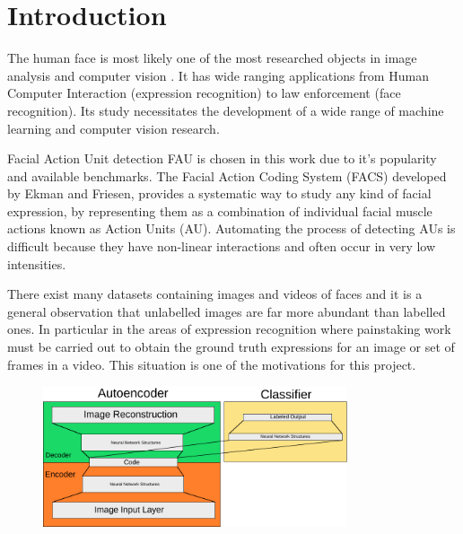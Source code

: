 \chapter{Introduction} \label{chap:intro}

  The human face is most likely one of the most researched objects in image analysis
  and computer vision \cite{S.ZafeiriouA.PapaioannouI.KotsiaM.A.Nicolaou}.
  It has wide ranging applications from Human
  Computer Interaction (expression recognition) to law enforcement (face recognition).
  Its study necessitates the development of a wide range of machine
  learning and computer vision research.

  Facial Action Unit detection FAU \cite{Corneanu2016} is chosen in this work due
  to it's popularity and available benchmarks.
  The Facial Action Coding System (FACS) developed by Ekman and Friesen,
  provides a systematic way to study any kind of facial expression,
  by representing them as a combination of individual facial muscle actions
  known as Action Units (AU). Automating the process of detecting AUs is difficult
  because they have non-linear interactions and often occur in very low intensities.

  There exist many datasets containing images and videos of faces and it is a general
  observation that unlabelled images are far more abundant than labelled ones.
  In particular in the areas of expression recognition where painstaking work
  must be carried out to obtain the ground truth expressions for an image or set of
  frames in a video. This situation is one of the motivations for this project.

  \begin{figure}
   \centering
   \includegraphics[width=0.8\textwidth]{illustrations/simple_network.pdf}
  \end{figure}

